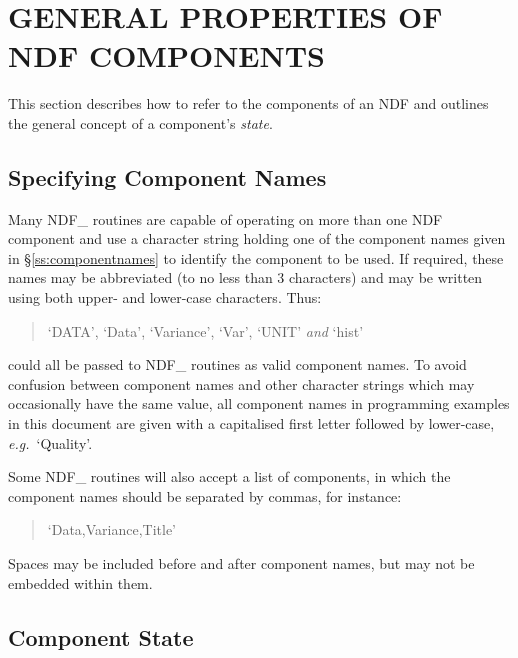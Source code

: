 \documentclass[twoside,11pt]{article}
\newcommand{\xlabel}[1]{}
\newcommand{\st}[1]{{\em{#1}}}
\begin{document}
\section{\xlabel{general_properties_of_ndf_components}GENERAL PROPERTIES OF NDF COMPONENTS}

This section describes how to refer to the components of an NDF and outlines 
the general concept of a component's \st{state}.

\subsection{\xlabel{specifying_component_names}\label{ss:componentnamespec}Specifying Component Names}

Many NDF\_ routines are capable of operating on more than one NDF component
and use a character string holding one of the component names given in
\S\ref{ss:componentnames} to identify the component to be used.
If required, these names may be abbreviated (to no less than 3  characters) and
may be written using both upper- and lower-case characters.
Thus:

\small
\begin{quote}
\begin{center}
`DATA', `Data', `Variance', `Var', `UNIT' \st{and\/} `hist'
\end{center}
\end{quote}
\normalsize

could all be passed to NDF\_ routines as valid component names.
To avoid confusion between component names and other character strings which may
occasionally have the same value, all component names in programming examples in
this document are given with a capitalised first  letter followed by lower-case,
\st{e.g.}\ `Quality'.

Some NDF\_ routines will also accept a list of components, in which the
component names should be separated by commas, for instance: 

\small
\begin{quote}
\begin{center}
`Data,Variance,Title'
\end{center}
\end{quote}
\normalsize

Spaces may be included before and after component names, but may not be 
embedded within them.

\subsection{\xlabel{component_state}Component State}
\end{document}
